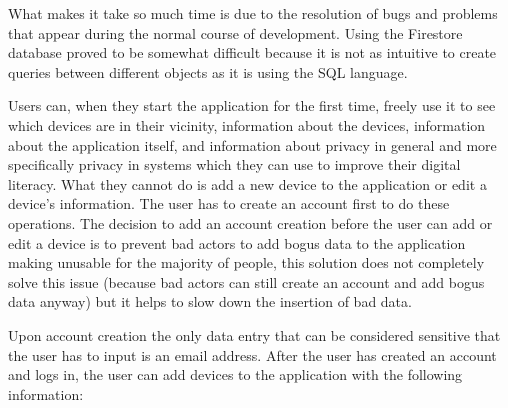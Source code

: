 What makes it take so much time is due to the resolution of bugs and
problems that appear during the normal course of development. Using
the Firestore database proved to be somewhat difficult because
it is not as intuitive to create queries between different objects
as it is using the SQL language.

Users can, when they start the application for the first time, freely use it to see
which devices are in their vicinity,
information about the devices, information about the application itself, and
information about privacy in general and more specifically privacy in \hyperlink{\acronym}{\acronym} systems
which they can use to improve their digital literacy. What they cannot do is
add a new device to the application or edit a device's information. The user has
to create an account first to do these operations. The decision to add an
account creation before the user can add or edit a device is to prevent
bad actors to add bogus data to the application making unusable for the majority
of people, this solution does not completely solve this issue (because bad actors
can still create an account and add bogus data anyway) but it helps to slow
down the insertion of bad data.

Upon account creation the only data entry that can be considered sensitive that
the user has to input is an email address.
After the user has created an account and logs in, the user can add devices to the application with the following information:

